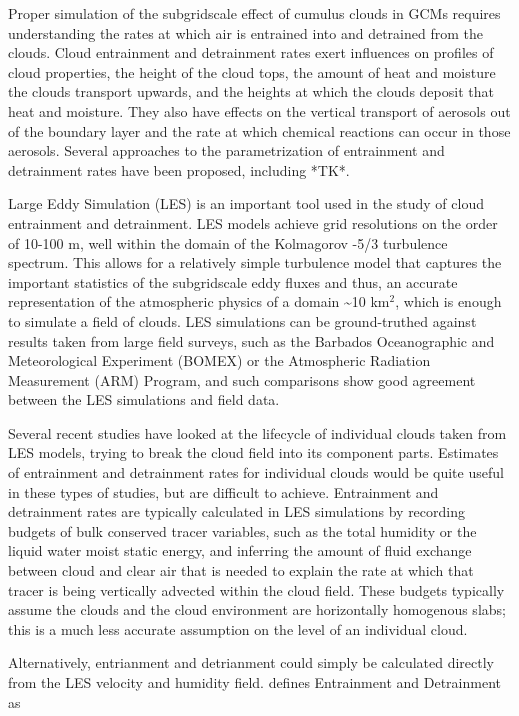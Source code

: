 \documentclass[12pt]{article}
\begin{document}
Proper simulation of the subgridscale effect of cumulus clouds in
GCMs requires understanding the rates at which air is entrained into
and detrained from the clouds. Cloud entrainment and detrainment rates
exert influences on profiles of cloud properties, the height of the
cloud tops, the amount of heat and moisture the clouds transport upwards,
and the heights at which the clouds deposit that heat and moisture.
They also have effects on the vertical transport of aerosols out of
the boundary layer and the rate at which chemical reactions can occur
in those aerosols. Several approaches to the parametrization of entrainment
and detrainment rates have been proposed, including *TK*.

Large Eddy Simulation (LES) is an important tool used in the study
of cloud entrainment and detrainment. LES models achieve grid resolutions
on the order of 10-100 m, well within the domain of the Kolmagorov -5/3
turbulence spectrum. This allows for a relatively simple turbulence
model that captures the important statistics of the subgridscale eddy
fluxes and thus, an accurate representation of the atmospheric physics
of a domain \textasciitilde{}10 km$^{2}$, which is enough to simulate
a field of clouds. LES simulations can be ground-truthed against results
taken from large field surveys, such as the Barbados Oceanographic
and Meteorological Experiment (BOMEX) or the Atmospheric Radiation
Measurement (ARM) Program, and such comparisons show good agreement
between the LES simulations and field data.

Several recent studies have looked at the lifecycle of individual
clouds taken from LES models, trying to break the cloud field into
its component parts. Estimates of entrainment and detrainment rates
for individual clouds would be quite useful in these types of studies,
but are difficult to achieve. Entrainment and detrainment rates are 
typically calculated in LES simulations by recording budgets
of bulk conserved tracer variables, such as the total humidity or
the liquid water moist static energy, and inferring the amount of
fluid exchange between cloud and clear air that is needed to explain
the rate at which that tracer is being vertically advected within
the cloud field. These budgets typically assume the clouds and the
cloud environment are horizontally homogenous slabs; this is a much
less accurate assumption on the level of an individual cloud.

Alternatively, entrianment and detrianment could simply be calculated
directly from the LES velocity and humidity field.  \cite{Siebesma1998} 
defines Entrainment and Detrainment as
\end{document}
